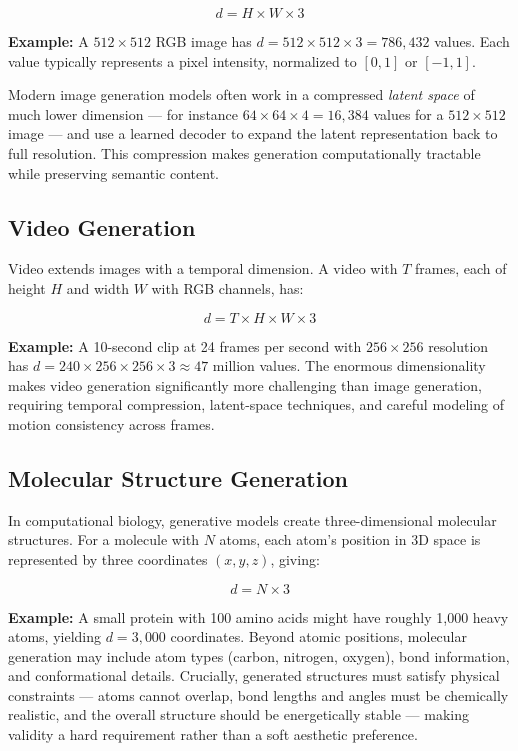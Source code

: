 \documentclass{book}
\begin{document}
\begin{equation}
d = H \times W \times 3
\end{equation}

\textbf{Example:} A $512 \times 512$ RGB image has $d = 512 \times 512 \times
3 = 786{,}432$ values. Each value typically represents a pixel intensity,
normalized to $[0, 1]$ or $[-1, 1]$.

Modern image generation models often work in a compressed \emph{latent space}
of much lower dimension --- for instance $64 \times 64 \times 4 = 16{,}384$
values for a $512 \times 512$ image --- and use a learned decoder to expand the
latent representation back to full resolution. This compression makes generation
computationally tractable while preserving semantic content.

\subsection{Video Generation}

Video extends images with a temporal dimension. A video with $T$ frames, each of
height $H$ and width $W$ with RGB channels, has:

\begin{equation}
d = T \times H \times W \times 3
\end{equation}

\textbf{Example:} A 10-second clip at 24 frames per second with $256 \times 256$
resolution has $d = 240 \times 256 \times 256 \times 3 \approx 47$ million
values. The enormous dimensionality makes video generation significantly more
challenging than image generation, requiring temporal compression, latent-space
techniques, and careful modeling of motion consistency across frames.

\subsection{Molecular Structure Generation}

In computational biology, generative models create three-dimensional molecular
structures. For a molecule with $N$ atoms, each atom's position in 3D space is
represented by three coordinates $(x, y, z)$, giving:

\begin{equation}
d = N \times 3
\end{equation}

\textbf{Example:} A small protein with 100 amino acids might have roughly 1,000
heavy atoms, yielding $d = 3{,}000$ coordinates. Beyond atomic positions,
molecular generation may include atom types (carbon, nitrogen, oxygen), bond
information, and conformational details. Crucially, generated structures must
satisfy physical constraints --- atoms cannot overlap, bond lengths and angles
must be chemically realistic, and the overall structure should be energetically
stable --- making validity a hard requirement rather than a soft aesthetic
preference.
\end{document}
